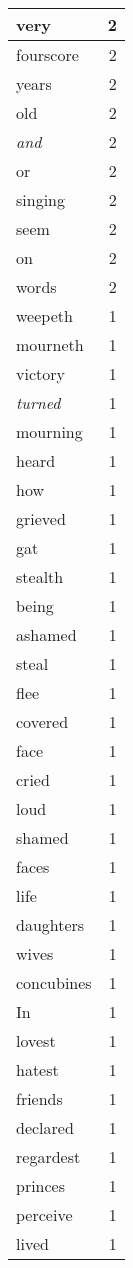 \begin{center}
\begin{longtable}{l|r}
very & 2 \\ \hline
fourscore & 2 \\ \hline
years & 2 \\ \hline
old & 2 \\ \hline
\emph{and} & 2 \\ \hline
or & 2 \\ \hline
singing & 2 \\ \hline
seem & 2 \\ \hline
on & 2 \\ \hline
words & 2 \\ \hline
weepeth & 1 \\ \hline
mourneth & 1 \\ \hline
victory & 1 \\ \hline
\emph{turned} & 1 \\ \hline
mourning & 1 \\ \hline
heard & 1 \\ \hline
how & 1 \\ \hline
grieved & 1 \\ \hline
gat & 1 \\ \hline
stealth & 1 \\ \hline
being & 1 \\ \hline
ashamed & 1 \\ \hline
steal & 1 \\ \hline
flee & 1 \\ \hline
covered & 1 \\ \hline
face & 1 \\ \hline
cried & 1 \\ \hline
loud & 1 \\ \hline
shamed & 1 \\ \hline
faces & 1 \\ \hline
life & 1 \\ \hline
daughters & 1 \\ \hline
wives & 1 \\ \hline
concubines & 1 \\ \hline
In & 1 \\ \hline
lovest & 1 \\ \hline
hatest & 1 \\ \hline
friends & 1 \\ \hline
declared & 1 \\ \hline
regardest & 1 \\ \hline
princes & 1 \\ \hline
perceive & 1 \\ \hline
lived & 1 \\ \hline

\end{longtable}
\end{center}

